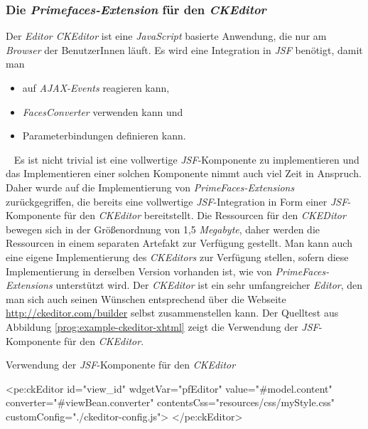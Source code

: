 \subsubsection{Die \emph{Primefaces-Extension} für den \emph{CKEditor}}
Der \emph{Editor CKEditor} ist eine \emph{JavaScript} basierte Anwendung, die nur am \emph{Browser} der BenutzerInnen läuft. Es wird eine Integration in \emph{JSF} benötigt, damit man
\begin{itemize}
	\item auf \emph{AJAX-Events} reagieren kann,
	\item\emph{FacesConverter} verwenden kann und
	\item Parameterbindungen definieren kann.
\end{itemize}
\ \newline
Es ist nicht trivial ist eine vollwertige \emph{JSF}-Komponente zu implementieren und das Implementieren einer solchen Komponente nimmt auch viel Zeit in Anspruch. Daher wurde auf die Implementierung von \emph{PrimeFaces-Extensions} zurückgegriffen, die bereits eine vollwertige \emph{JSF}-Integration in Form einer \emph{JSF}-Komponente für den \emph{CKEditor} bereitstellt.
\newline
\newline
Die Ressourcen für den \emph{CKEDitor} bewegen sich in der Größenordnung von 1,5 \emph{Megabyte}, daher werden die Ressourcen in einem separaten Artefakt zur Verfügung gestellt. Man kann auch eine eigene Implementierung des \emph{CKEditors} zur Verfügung stellen, sofern diese Implementierung in derselben Version vorhanden ist, wie von \emph{PrimeFaces-Extensions} unterstützt wird. Der \emph{CKEditor} ist ein sehr umfangreicher \emph{Editor}, den man sich auch seinen Wünschen entsprechend über die Webseite \url{http://ckeditor.com/builder} selbst zusammenstellen kann.
\newline
\newline
Der Quelltest aus Abbildung \ref{prog:example-ckeditor-xhtml} zeigt die Verwendung der \emph{JSF}-Komponente für den \emph{CKEditor}.
\begin{program}[h]
\caption{Verwendung der \emph{JSF}-Komponente für den \emph{CKEditor}}
\label{prog:example-ckeditor-xhtml}
\begin{HtmlCode}
<pe:ckEditor id="view_id"
             wdgetVar="pfEditor"
             value="#{model.content}"
             converter="#{viewBean.converter}" 
             contentsCss="resources/css/myStyle.css"
             customConfig="./ckeditor-config.js">
</pe:ckEditor>
\end{HtmlCode}
\end{program}
